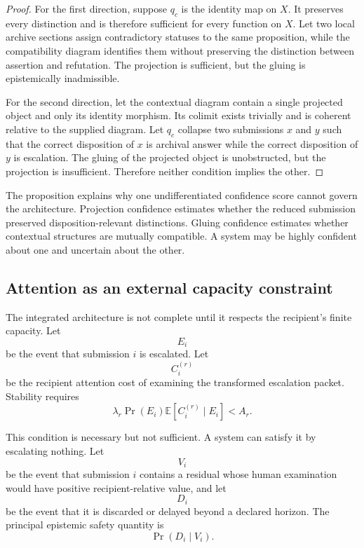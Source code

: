 \documentclass[11pt]{article}
\theoremstyle{definition}
\DeclareMathOperator{\Prob}{Pr}
\newcommand{\E}{\mathbb{E}}
\begin{document}
\begin{proof}
For the first direction, suppose \(q_c\) is the identity map on \(X\). It preserves every distinction and is therefore sufficient for every function on \(X\). Let two local archive sections assign contradictory statuses to the same proposition, while the compatibility diagram identifies them without preserving the distinction between assertion and refutation. The projection is sufficient, but the gluing is epistemically inadmissible.

For the second direction, let the contextual diagram contain a single projected object and only its identity morphism. Its colimit exists trivially and is coherent relative to the supplied diagram. Let \(q_c\) collapse two submissions \(x\) and \(y\) such that the correct disposition of \(x\) is archival answer while the correct disposition of \(y\) is escalation. The gluing of the projected object is unobstructed, but the projection is insufficient. Therefore neither condition implies the other.
\end{proof}

The proposition explains why one undifferentiated confidence score cannot govern the architecture. Projection confidence estimates whether the reduced submission preserved disposition-relevant distinctions. Gluing confidence estimates whether contextual structures are mutually compatible. A system may be highly confident about one and uncertain about the other.

\subsection{Attention as an external capacity constraint}

The integrated architecture is not complete until it respects the recipient's finite capacity. Let
\[
E_i
\]
be the event that submission \(i\) is escalated. Let
\[
C_i^{(r)}
\]
be the recipient attention cost of examining the transformed escalation packet. Stability requires
\[
\lambda_r
\Prob(E_i)
\E[C_i^{(r)}\mid E_i]
<
A_r.
\]

This condition is necessary but not sufficient. A system can satisfy it by escalating nothing. Let
\[
V_i
\]
be the event that submission \(i\) contains a residual whose human examination would have positive recipient-relative value, and let
\[
D_i
\]
be the event that it is discarded or delayed beyond a declared horizon. The principal epistemic safety quantity is
\[
\Prob(D_i\mid V_i).
\]
\end{document}
